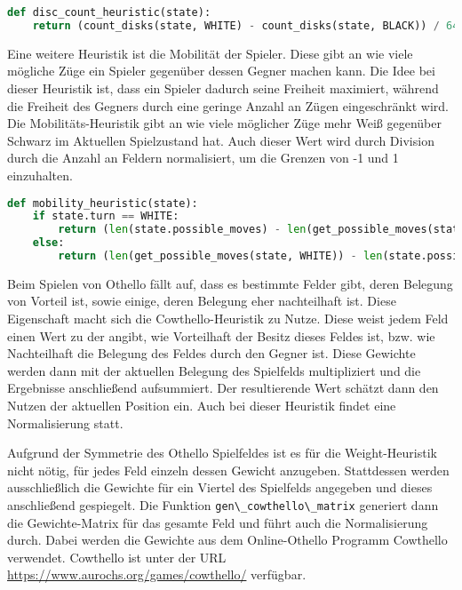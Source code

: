 \begin{lstlisting}[language=Python]
def disc_count_heuristic(state):
    return (count_disks(state, WHITE) - count_disks(state, BLACK)) / 64
\end{lstlisting}

Eine weitere Heuristik ist die Mobilität der Spieler. Diese gibt an wie
viele mögliche Züge ein Spieler gegenüber dessen Gegner machen kann. Die
Idee bei dieser Heuristik ist, dass ein Spieler dadurch seine Freiheit
maximiert, während die Freiheit des Gegners durch eine geringe Anzahl an
Zügen eingeschränkt wird. Die Mobilitäts-Heuristik gibt an wie viele
möglicher Züge mehr Weiß gegenüber Schwarz im Aktuellen Spielzustand
hat. Auch dieser Wert wird durch Division durch die Anzahl an Feldern
normalisiert, um die Grenzen von -1 und 1 einzuhalten.

\begin{lstlisting}[language=Python]
def mobility_heuristic(state):
    if state.turn == WHITE:
        return (len(state.possible_moves) - len(get_possible_moves(state, BLACK))) / 64
    else:
        return (len(get_possible_moves(state, WHITE)) - len(state.possible_moves)) / 64
\end{lstlisting}

Beim Spielen von Othello fällt auf, dass es bestimmte Felder gibt, deren
Belegung von Vorteil ist, sowie einige, deren Belegung eher nachteilhaft
ist. Diese Eigenschaft macht sich die Cowthello-Heuristik zu Nutze.
Diese weist jedem Feld einen Wert zu der angibt, wie Vorteilhaft der
Besitz dieses Feldes ist, bzw. wie Nachteilhaft die Belegung des Feldes
durch den Gegner ist. Diese Gewichte werden dann mit der aktuellen
Belegung des Spielfelds multipliziert und die Ergebnisse anschließend
aufsummiert. Der resultierende Wert schätzt dann den Nutzen der
aktuellen Position ein. Auch bei dieser Heuristik findet eine
Normalisierung statt.

Aufgrund der Symmetrie des Othello Spielfeldes ist es für die
Weight-Heuristik nicht nötig, für jedes Feld einzeln dessen Gewicht
anzugeben. Stattdessen werden ausschließlich die Gewichte für ein
Viertel des Spielfelds angegeben und dieses anschließend gespiegelt. Die
Funktion \passthrough{\lstinline!gen\_cowthello\_matrix!} generiert dann
die Gewichte-Matrix für das gesamte Feld und führt auch die
Normalisierung durch. Dabei werden die Gewichte aus dem Online-Othello
Programm Cowthello verwendet. Cowthello ist unter der URL
\url{https://www.aurochs.org/games/cowthello/} verfügbar.

